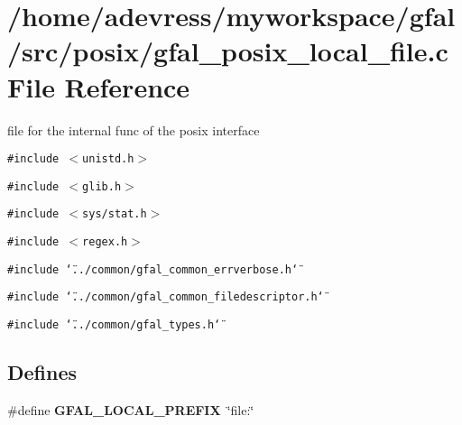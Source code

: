 \section{/home/adevress/myworkspace/gfal/src/posix/gfal\_\-posix\_\-local\_\-file.c File Reference}
\label{gfal__posix__local__file_8c}
file for the internal func of the posix interface 

{\tt \#include $<$unistd.h$>$}\par
{\tt \#include $<$glib.h$>$}\par
{\tt \#include $<$sys/stat.h$>$}\par
{\tt \#include $<$regex.h$>$}\par
{\tt \#include \char`\"{}../common/gfal\_\-common\_\-errverbose.h\char`\"{}}\par
{\tt \#include \char`\"{}../common/gfal\_\-common\_\-filedescriptor.h\char`\"{}}\par
{\tt \#include \char`\"{}../common/gfal\_\-types.h\char`\"{}}\par
\subsection*{Defines}
\begin{CompactItemize}
\item 
\#define \textbf{GFAL\_\-LOCAL\_\-PREFIX}~\char`\"{}file:\char`\"{}\label{gfal__posix__local__file_8c_72e3f23638773071a6db4d9a354ccfdb}

\end{CompactItemize}
